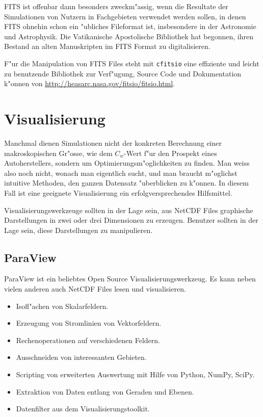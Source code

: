 FITS ist offenbar dann besonders zweckm"assig, wenn die Resultate
der Simulationen von Nutzern in Fachgebieten verwendet werden sollen,
in denen FITS ohnehin schon ein "ubliches Fileformat ist, insbesondere
in der Astronomie und Astrophysik.
Die Vatikanische Apostolische Bibliothek hat begonnen, ihren Bestand
an alten Manuskripten im FITS Format zu digitalisieren.

F"ur die Manipulation von FITS Files steht mit \texttt{cfitsio} eine effiziente
und leicht zu benutzende Bibliothek zur Verf"ugung, Source Code und
Dokumentation k"onnen von \url{http://heasarc.nasa.gov/fitsio/fitsio.html}.

\section{Visualisierung}
Manchmal dienen Simulationen nicht der konkreten Berechnung einer
makroskopischen Gr"osse, wie dem $C_w$-Wert f"ur den Prospekt eines
Autoherstellers, sondern um Optimierungsm"oglichkeiten zu finden.
Man weiss also noch nicht, wonach man eigentlich sucht, und man
braucht m"oglichst intuitive Methoden, den ganzen Datensatz
"uberblicken zu k"onnen.
In diesem Fall ist eine geeignete Visualisierung ein erfolgversprechendes
Hilfsmittel.

Visualisierungswerkzeuge sollten in der Lage sein, aus NetCDF Files
graphische Darstellungen in zwei oder drei Dimensionen zu erzeugen.
Benutzer sollten in der Lage sein, diese Darstellungen zu manipulieren.

\subsection{ParaView}
ParaView ist ein beliebtes Open Source Visualisierungswerkzeug.
Es kann neben vielen anderen auch NetCDF Files lesen und visualisieren.
\begin{itemize}
\item Isofl"achen von Skalarfeldern.
\item Erzeugung von Stromlinien von Vektorfeldern.
\item Rechenoperationen auf verschiedenen Feldern.
\item Ausschneiden von interessanten Gebieten.
\item Scripting von erweiterten Auswertung mit Hilfe von Python, NumPy, SciPy.
\item Extraktion von Daten entlang von Geraden und Ebenen.
\item Datenfilter aus dem Visualisierungstoolkit.
\end{itemize}

